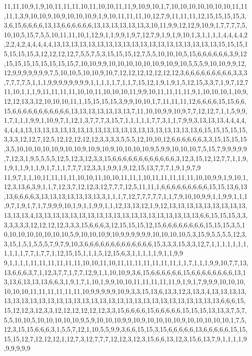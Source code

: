 11,11,10,9,1,9,10,11,11,11,10,11,10,10,11,11,9,10,9,10,1,7,10,10,10,10,10,10,10,11,11,11,1,3,9,10,10,9,10,9,10,10,10,9,1,9,10,11,11,11,10,12,7,9,11,11,11,12,15,15,15,15,3,3,6,15,6,6,6,6,13,13,6,6,6,6,6,6,13,13,13,13,13,13,3,10,11,9,9,12,12,9,10,9,1,7,7,7,7,5,10,10,5,15,7,5,5,10,11,11,10,1,12,9,1,1,9,9,1,9,7,12,7,9,1,9,1,9,10,1,3,1,1,1,1,4,4,4,4,2,2,2,4,2,4,4,4,4,4,13,13,13,13,13,13,13,13,13,13,13,13,13,13,13,13,13,13,13,15,15,15,15,15,15,15,3,12,12,12,12,7,5,5,7,5,3,15,15,15,12,7,5,5,10,10,10,5,15,6,6,6,6,6,6,3,9,12,15,15,15,15,15,15,15,15,7,10,10,9,9,10,10,10,10,10,10,9,10,9,10,5,5,5,9,10,10,9,9,12,12,9,9,9,9,9,9,9,7,5,10,10,5,10,10,9,10,7,12,12,12,12,12,12,12,3,6,6,6,6,6,6,6,6,6,3,3,3,7,7,7,7,5,1,1,1,9,9,9,9,9,9,9,9,1,1,1,1,1,7,1,1,7,15,12,1,9,1,9,1,5,12,15,3,3,7,1,9,7,12,7
11,10,1,1,1,9,11,11,11,11,10,10,11,10,10,10,11,9,9,10,11,11,11,11,9,1,10,10,10,1,10,9,12,12,13,3,12,10,10,10,11,1,15,15,15,15,3,9,9,10,10,1,7,11,11,11,12,6,6,6,6,15,15,6,6,15,6,6,6,6,6,6,6,6,6,6,6,13,13,13,13,13,13,13,7,11,10,10,9,9,10,9,7,7,12,12,7,1,1,5,9,9,1,7,1,1,1,9,9,1,10,9,7,1,12,1,3,7,7,7,3,15,7,1,1,1,1,1,7,7,3,1,1,7,9,9,3,13,13,13,4,4,4,4,4,4,4,4,13,13,13,13,13,13,13,13,13,13,13,13,13,13,13,13,13,13,13,13,6,15,15,15,15,15,3,3,3,12,12,7,12,5,12,12,12,12,12,3,3,3,3,5,5,5,12,10,10,12,6,6,6,6,6,6,3,3,15,15,15,15,3,5,10,10,10,10,10,9,10,10,9,10,9,10,9,10,10,10,10,9,5,9,9,10,10,10,7,5,15,7,9,9,9,9,9,7,12,3,1,9,5,5,5,5,12,5,12,3,12,3,3,15,6,6,6,6,6,6,6,6,6,6,6,6,3,12,3,15,12,12,7,7,1,1,9,1,9,1,1,9,1,1,9,1,7,1,1,7,7,7,12,3,3,1,9,9,1,9,12,15,13,7,7,7,1,9,1,9,7,9
11,9,7,1,1,10,11,11,11,11,10,10,11,10,10,11,11,1,10,11,11,11,11,11,10,10,9,9,1,9,10,1,12,3,13,6,3,9,1,1,7,12,3,7,12,12,3,12,7,7,7,12,5,11,11,1,6,6,6,6,6,6,6,6,6,15,15,13,6,13,13,6,6,6,6,3,13,13,13,13,13,13,13,3,1,1,1,7,12,7,7,7,7,7,1,1,7,9,10,10,9,9,1,1,9,9,1,1,1,9,7,1,9,1,7,1,7,9,9,9,10,1,9,1,1,9,9,1,1,12,13,13,12,1,9,12,13,13,13,13,13,13,13,13,13,13,13,13,4,13,13,13,13,13,13,13,13,13,13,13,13,13,13,13,13,13,13,13,6,6,15,15,15,3,3,3,3,3,3,3,12,12,12,12,3,3,3,15,6,6,6,3,12,15,15,15,12,15,6,6,6,6,6,6,6,6,15,15,15,3,5,10,10,10,10,10,10,10,10,5,9,10,10,10,9,10,9,9,9,9,9,9,10,10,10,10,5,3,15,9,5,5,5,5,12,3,3,15,1,5,1,5,5,5,7,9,7,9,10,3,6,6,6,6,6,6,6,6,6,6,6,6,6,15,3,3,3,15,3,3,12,7,1,1,1,1,1,1,1,1,1,1,1,7,7,1,7,7,1,12,15,15,1,1,1,5,12,15,6,3,1,1,1,1,1,9,1,1,9,9
9,1,1,1,1,11,11,11,11,11,11,10,10,11,10,11,11,11,11,11,11,11,1,1,7,1,1,1,9,9,10,7,7,13,13,6,6,6,3,7,1,12,3,7,7,1,7,7,12,9,1,1,10,10,9,3,6,15,6,6,6,6,6,6,15,6,6,6,6,6,6,6,6,13,13,13,6,13,13,13,6,6,3,1,9,1,7,1,10,1,9,9,10,10,11,11,11,11,11,9,1,9,1,7,9,9,9,10,10,10,10,10,10,11,11,11,11,11,11,10,9,9,9,9,9,10,9,3,3,15,13,6,13,3,12,3,13,3,4,13,13,13,13,13,13,13,13,13,13,13,13,13,13,13,13,13,13,13,13,13,13,13,13,13,13,13,13,13,6,6,6,15,15,12,12,3,12,3,3,12,12,12,12,12,12,3,3,15,6,6,6,6,15,6,6,6,6,6,15,15,15,13,13,3,7,5,7,5,5,10,10,5,10,10,10,10,10,9,5,9,10,10,10,9,9,10,9,10,10,10,10,9,10,10,10,10,10,1,7,5,12,3,15,15,6,6,6,3,1,5,5,7,12,1,10,5,5,9,9,3,6,6,15,15,3,15,6,6,6,6,6,13,6,6,6,6,6,15,15,15,15,12,7,12,12,12,1,12,7,3,12,7,7,7,12,12,3,12,3,15,6,6,13,12,3,15,6,13,7,9,1,1,1,1,9,9,9,9,9,9
